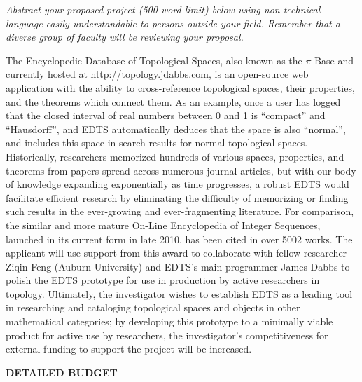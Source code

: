 \documentclass[11pt]{article}
\begin{document}
\textit{Abstract your proposed project (500-word limit) below using non-technical language easily understandable to persons outside your field.  Remember that a diverse group of faculty will be reviewing your proposal.}\vspace{2em}

The Encyclopedic Database of Topological Spaces, also known as the \(\pi\)-Base and currently hosted at http://topology.jdabbs.com, is an open-source web application with the ability to cross-reference topological spaces, their properties, and the theorems which connect them. As an example, once a user has logged that the closed interval of real numbers between 0 and 1 is ``compact'' and ``Hausdorff'', and EDTS automatically deduces that the space is also ``normal'', and includes this space in search results for normal topological spaces. Historically, researchers memorized hundreds of various spaces, properties, and theorems from papers spread across numerous journal articles, but with our body of knowledge expanding exponentially as time progresses, a robust EDTS would facilitate efficient research by eliminating the difficulty of memorizing or finding such results in the ever-growing and ever-fragmenting literature. For comparison, the similar and more mature On-Line Encyclopedia of Integer Sequences, launched in its current form in late 2010, has been cited in over 5002 works. The applicant will use support from this award to collaborate with fellow researcher Ziqin Feng (Auburn University) and EDTS's main programmer James Dabbs to polish the EDTS prototype for use in production by active researchers in topology. Ultimately, the investigator wishes to establish EDTS as a leading tool in researching and cataloging topological spaces and objects in other mathematical categories; by developing this prototype to a minimally viable product for active use by researchers, the investigator’s competitiveness for external funding to support the project will be increased.

\newpage

\centerline{\bf\Large
DETAILED BUDGET
}
\end{document}
